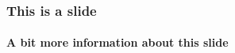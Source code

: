 
\begin{frame}
  \frametitle{This is a slide}
  \framesubtitle{A bit more information about this slide}
\end{frame}
